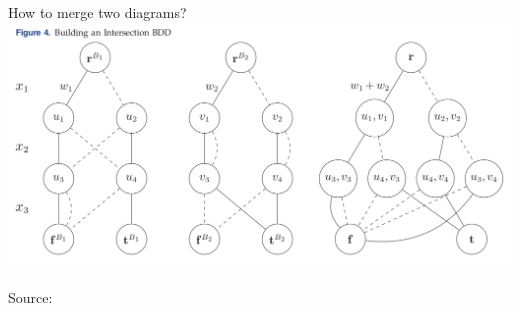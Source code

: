 \documentclass[10pt, xcolor=svgnames]{beamer}
\begin{document}
\begin{frame}[label={sec:org2eb9891}]{How to merge two diagrams?}
\centering
\includegraphics[width=\textwidth]{./img/merging.png}

Source: \cite{lozano2020}
\end{frame}
\end{document}
